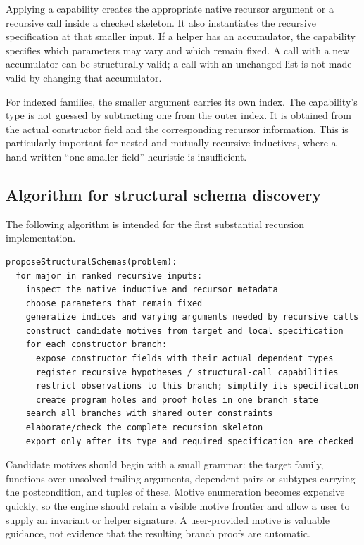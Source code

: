 Applying a capability creates the appropriate native recursor argument or a recursive call inside a checked skeleton. It also instantiates the recursive specification at that smaller input. If a helper has an accumulator, the capability specifies which parameters may vary and which remain fixed. A call with a new accumulator can be structurally valid; a call with an unchanged list is not made valid by changing that accumulator.

For indexed families, the smaller argument carries its own index. The capability's type is not guessed by subtracting one from the outer index. It is obtained from the actual constructor field and the corresponding recursor information. This is particularly important for nested and mutually recursive inductives, where a hand-written ``one smaller field'' heuristic is insufficient.

\subsection{Algorithm for structural schema discovery}

The following algorithm is intended for the first substantial recursion implementation.

\par\noindent\begin{minipage}{\linewidth}
\begin{lstlisting}[language={}]
proposeStructuralSchemas(problem):
  for major in ranked recursive inputs:
    inspect the native inductive and recursor metadata
    choose parameters that remain fixed
    generalize indices and varying arguments needed by recursive calls
    construct candidate motives from target and local specification
    for each constructor branch:
      expose constructor fields with their actual dependent types
      register recursive hypotheses / structural-call capabilities
      restrict observations to this branch; simplify its specification
      create program holes and proof holes in one branch state
    search all branches with shared outer constraints
    elaborate/check the complete recursion skeleton
    export only after its type and required specification are checked
\end{lstlisting}
\end{minipage}\par

Candidate motives should begin with a small grammar: the target family, functions over unsolved trailing arguments, dependent pairs or subtypes carrying the postcondition, and tuples of these. Motive enumeration becomes expensive quickly, so the engine should retain a visible motive frontier and allow a user to supply an invariant or helper signature. A user-provided motive is valuable guidance, not evidence that the resulting branch proofs are automatic.

